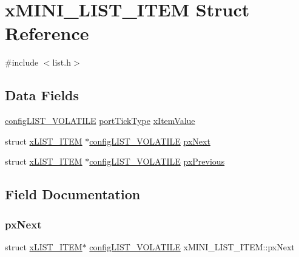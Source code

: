 \hypertarget{structx_m_i_n_i___l_i_s_t___i_t_e_m}{}\section{x\+M\+I\+N\+I\+\_\+\+L\+I\+S\+T\+\_\+\+I\+T\+EM Struct Reference}
\label{structx_m_i_n_i___l_i_s_t___i_t_e_m}


{\ttfamily \#include $<$list.\+h$>$}

\subsection*{Data Fields}
\begin{DoxyCompactItemize}
\item 
\mbox{\hyperlink{list_8h_a2d5de557c5561c8980d1bf51d87d8cba}{config\+L\+I\+S\+T\+\_\+\+V\+O\+L\+A\+T\+I\+LE}} \mbox{\hyperlink{portmacro_8h_a4d746b2ff8fafc490b764c66411ec457}{port\+Tick\+Type}} \mbox{\hyperlink{structx_m_i_n_i___l_i_s_t___i_t_e_m_a15a3f1840e5f2a5f59c7f06a355f6e82}{x\+Item\+Value}}
\item 
struct \mbox{\hyperlink{structx_l_i_s_t___i_t_e_m}{x\+L\+I\+S\+T\+\_\+\+I\+T\+EM}} $\ast$\mbox{\hyperlink{list_8h_a2d5de557c5561c8980d1bf51d87d8cba}{config\+L\+I\+S\+T\+\_\+\+V\+O\+L\+A\+T\+I\+LE}} \mbox{\hyperlink{structx_m_i_n_i___l_i_s_t___i_t_e_m_aa7ae770b0f10daeb9ac76c6f7dd5608e}{px\+Next}}
\item 
struct \mbox{\hyperlink{structx_l_i_s_t___i_t_e_m}{x\+L\+I\+S\+T\+\_\+\+I\+T\+EM}} $\ast$\mbox{\hyperlink{list_8h_a2d5de557c5561c8980d1bf51d87d8cba}{config\+L\+I\+S\+T\+\_\+\+V\+O\+L\+A\+T\+I\+LE}} \mbox{\hyperlink{structx_m_i_n_i___l_i_s_t___i_t_e_m_a732c666bb97560eb1b094a2c411269ab}{px\+Previous}}
\end{DoxyCompactItemize}


\subsection{Field Documentation}
\mbox{\label{structx_m_i_n_i___l_i_s_t___i_t_e_m_aa7ae770b0f10daeb9ac76c6f7dd5608e}} 
\subsubsection{\texorpdfstring{px\+Next}{pxNext}}
{\footnotesize\ttfamily struct \mbox{\hyperlink{structx_l_i_s_t___i_t_e_m}{x\+L\+I\+S\+T\+\_\+\+I\+T\+EM}}$\ast$ \mbox{\hyperlink{list_8h_a2d5de557c5561c8980d1bf51d87d8cba}{config\+L\+I\+S\+T\+\_\+\+V\+O\+L\+A\+T\+I\+LE}} x\+M\+I\+N\+I\+\_\+\+L\+I\+S\+T\+\_\+\+I\+T\+E\+M\+::px\+Next}

